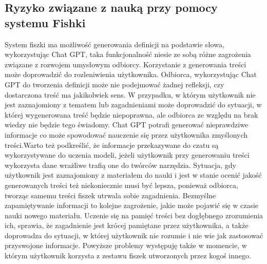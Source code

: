 \subsection{Ryzyko związane z nauką przy pomocy systemu Fishki}
System fiszki ma możliwość generowania definicji na podstawie słowa, wykorzystując Chat GPT, taka funkcjonalność niesie ze sobą różne zagrożenia związane z rozwojem umysłowym odbiorcy. Korzystanie z generowania treści może doprowadzić do rozleniwienia użytkownika. Odbiorca, wykorzystując Chat GPT do tworzenia definicji może nie podejmować żadnej refleksji, czy dostarczona treść ma jakikolwiek sens. W przypadku, w którym użytkownik nie jest zaznajomiony z tematem lub zagadnieniami może doprowadzić do sytuacji, w której wygenerowana treść będzie niepoprawna, ale odbiorca ze względu na brak wiedzy nie będzie tego świadomy. Chat GPT potrafi generować nieprawdziwe informacje co może spowodować nauczenie się przez użytkownika zmyślonych treści.Warto też podkreślić, że informacje przekazywane do czatu są wykorzystywane do uczenia modeli, jeżeli użytkownik przy generowaniu treści wykorzysta dane wrażliwe trafią one do twórców narzędzia\cite{chatGptRisk}. Sytuacja, gdy użytkownik jest zaznajomiony z materiałem do nauki i jest w stanie ocenić jakość generowanych treści też niekoniecznie musi być lepsza, ponieważ odbiorca, tworząc samemu treści fiszek utrwala sobie zagadnienia. Bezmyślne zapamiętywanie informacji to kolejne zagrożenie, jakie może pojawić się w czasie nauki nowego materiału. Uczenie się na pamięć treści bez dogłębnego zrozumienia ich, sprawia, że zagadnienie jest krócej pamiętane przez użytkownika, a także doprowadza do sytuacji, w której użytkownik nie rozumie i nie wie jak zastosować przyswojone informacje. Powyższe problemy występuję także w momencie, w którym użytkownik korzysta z zestawu fiszek utworzonych przez kogoś innego.
